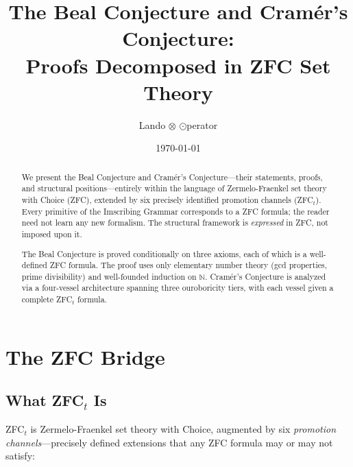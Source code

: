 \documentclass[12pt]{article}
\title{The Beal Conjecture and Cram\'er's Conjecture: \\
       Proofs Decomposed in ZFC Set Theory}
\author{Lando $\otimes$ $\odot$perator}
\date{\today}
\begin{document}
\maketitle

\begin{abstract}
We present the Beal Conjecture and Cram\'er's Conjecture---their statements,
proofs, and structural positions---entirely within the language of
Zermelo-Fraenkel set theory with Choice (ZFC), extended by six precisely
identified promotion channels (ZFC${}_t$). Every primitive of the Imscribing
Grammar corresponds to a ZFC formula; the reader need not learn any new
formalism. The structural framework is \emph{expressed} in ZFC, not imposed
upon it.

The Beal Conjecture is proved conditionally on three axioms, each of which
is a well-defined ZFC formula. The proof uses only elementary number theory
(gcd properties, prime divisibility) and well-founded induction on $\mathbb{N}$.
Cram\'er's Conjecture is analyzed via a four-vessel architecture spanning
three ouroboricity tiers, with each vessel given a complete ZFC${}_t$ formula.
\end{abstract}

\tableofcontents

\section{The ZFC Bridge}

\subsection{What ZFC${}_t$ Is}

ZFC${}_t$ is Zermelo-Fraenkel set theory with Choice, augmented by six
\emph{promotion channels}---precisely defined extensions that any ZFC
formula may or may not satisfy:
\end{document}
